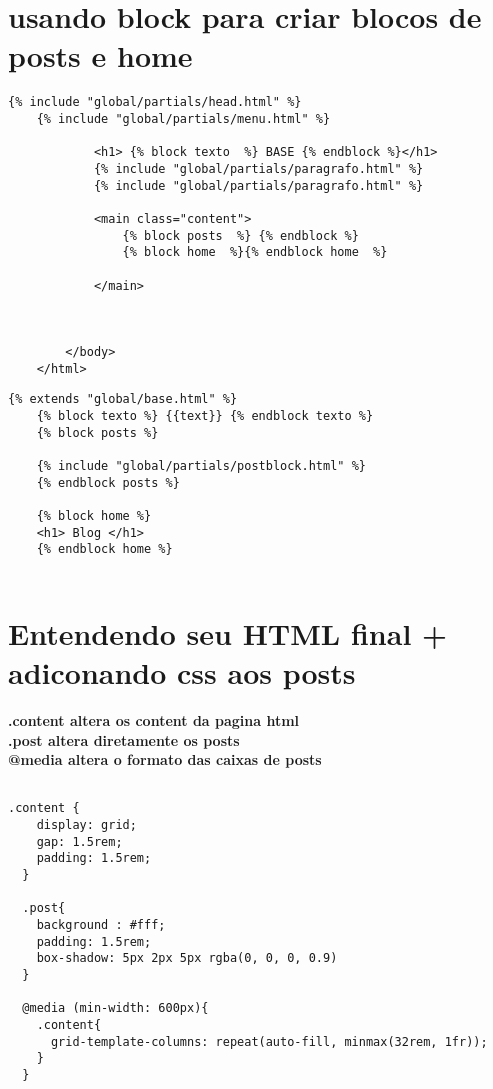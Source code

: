 \documentclass{article}
\begin{document}
\section{usando block para criar blocos de posts e home }
\begin{lstlisting}[style=djangohtml, caption={base/global/base.html}]
    {% include "global/partials/head.html" %}
    {% include "global/partials/menu.html" %}
    
            <h1> {% block texto  %} BASE {% endblock %}</h1>
            {% include "global/partials/paragrafo.html" %}
            {% include "global/partials/paragrafo.html" %}
    
            <main class="content">
                {% block posts  %} {% endblock %}
                {% block home  %}{% endblock home  %}
                
            </main>
            
            
            
        </body>
    </html>
\end{lstlisting}

\begin{lstlisting}[style=djangohtml, caption={blog/templates/blog/blog.html}]
    {% extends "global/base.html" %}
    {% block texto %} {{text}} {% endblock texto %}
    {% block posts %}
    
    {% include "global/partials/postblock.html" %}
    {% endblock posts %}
    
    {% block home %}
    <h1> Blog </h1>
    {% endblock home %}
    
\end{lstlisting}

\section{Entendendo seu HTML final + adiconando css aos posts}
\textbf{.content altera os content da pagina html\\}
\textbf{.post altera diretamente os posts\\}
\textbf{@media altera o formato das caixas de posts}
\begin{lstlisting}[style=cssStyle, caption={base/static/global/css/style.css}]
    
.content {
    display: grid;
    gap: 1.5rem;
    padding: 1.5rem;
  }
  
  .post{
    background : #fff;
    padding: 1.5rem;
    box-shadow: 5px 2px 5px rgba(0, 0, 0, 0.9)
  }
  
  @media (min-width: 600px){
    .content{
      grid-template-columns: repeat(auto-fill, minmax(32rem, 1fr));
    }
  }
  
\end{lstlisting}
\end{document}
